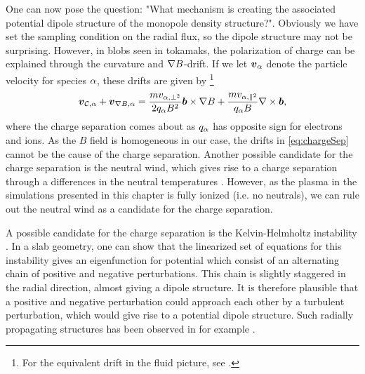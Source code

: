 One can now pose the question:
"What mechanism is creating the associated potential dipole structure of the monopole density structure?".
Obviously we have set the sampling condition on the radial flux, so the dipole structure may not be surprising.
However, in blobs seen in tokamaks, the polarization of charge can be explained through the curvature and $\nabla B$-drift.
If we let $\boldsymbol{v}_\alpha$ denote the particle velocity for species $\alpha$, these drifts are given by%
\footnote{For the equivalent drift in the fluid picture, see \cite{Garcia2003}.}
%
\begin{align}
    \boldsymbol{v}_{\mathcal{C},\alpha} + \boldsymbol{v}_{\nabla B,\alpha} = \frac{m v_{\alpha,\perp^2}}{2q_\alpha B^2}\boldsymbol{b}\times\nabla B + \frac{m v_{\alpha,\|^2}}{q_\alpha B}\nabla\times\boldsymbol{b},
    \label{eq:chargeSep}
\end{align}
%
where the charge separation comes about as $q_\alpha$ has opposite sign for electrons and ions.
As the $B$ field is homogeneous in our case, the drifts in \cref{eq:chargeSep} cannot be the cause of the charge separation.
Another possible candidate for the charge separation is the neutral wind, which gives rise to a charge separation through a differences in the neutral temperatures \cite{Krasheninnikov2003}.
However, as the plasma in the simulations presented in this chapter is fully ionized (i.e. no neutrals), we can rule out the neutral wind as a candidate for the charge separation.

A possible candidate for the charge separation is the Kelvin-Helmholtz instability \cite{Horton1987,Pecseli2012book}.
In a slab geometry, one can show that the linearized set of equations for this instability gives an eigenfunction for potential which consist of an alternating chain of positive and negative perturbations.
This chain is slightly staggered in the radial direction, almost giving a dipole structure.
It is therefore plausible that a positive and negative perturbation could approach each other by a turbulent perturbation, which would give rise to a potential dipole structure.
Such radially propagating structures has been observed in for example \cite{Nielsen1996}.

